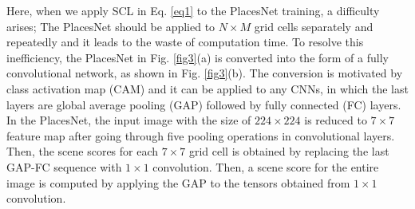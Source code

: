 \documentclass[journal,comsoc]{IEEEtran}
\begin{document}
Here, when we apply SCL in Eq. \ref{eq1} to the PlacesNet training, a difficulty arises; The PlacesNet should be applied to $N \times M$ grid cells separately and repeatedly and it leads to the waste of computation time. To resolve this inefficiency, the PlacesNet in Fig. \ref{fig3}(a) is converted into the form of a fully convolutional network, as shown in Fig. \ref{fig3}(b). The conversion is motivated by class activation map (CAM) \cite{b25} and it can be applied to any CNNs, in which the last layers are global average pooling (GAP) followed by fully connected (FC) layers. In the PlacesNet, the input image with the size of $224 \times 224$ is reduced to $7 \times 7$ feature map after going through five pooling operations in convolutional layers. Then, the scene scores for each $7 \times 7$ grid cell is obtained by replacing the last GAP-FC sequence with $1 \times 1$ convolution. Then, a scene score for the entire image is computed by applying the GAP to the tensors obtained from $1 \times 1$ convolution.
\end{document}
